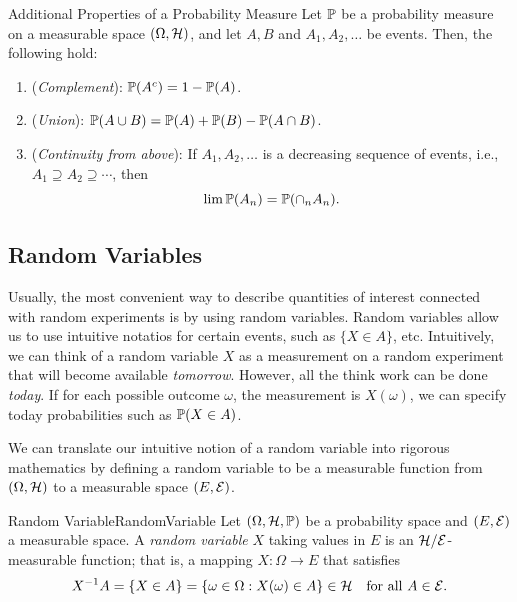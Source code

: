 \begin{thm}{Additional Properties of a Probability Measure}{}
	Let $\mathbb{P}$ be a probability measure on a measurable space $(\Omega, \mathcal{H})$, and let $A, B$ and $A_1, A_2, \dots$ be events. Then, the following hold:
	\begin{enumerate}
		\item (\textit{Complement}): $\mathbb{P}(A^c) = 1 - \mathbb{P}(A)$.
		\item (\textit{Union}): $\mathbb{P}(A \cup B) = \mathbb{P}(A) + \mathbb{P}(B) - \mathbb{P}(A \cap B)$.
		\item (\textit{Continuity from above}): If $A_1, A_2, \dots$ is a decreasing sequence of events, i.e., $A_1 \supseteq A_2 \supseteq \cdots$, then
		      \begin{equation}
			      \lim \mathbb{P}(A_n) = \mathbb{P}(\cap_n A_n).
			      \label{eq:ContinuityFromAbove}
		      \end{equation}
	\end{enumerate}
\end{thm}

\subsection{Random Variables}
Usually, the most convenient way to describe quantities of interest connected with random experiments is by using random variables. Random variables allow us to use intuitive notatios for certain events, such as \(\{X \in A\}\), etc. Intuitively, we can think of a random variable \(X\) as a measurement on a random experiment that will become available \textit{tomorrow}. However, all the think work can be done \textit{today}. If for each possible outcome \(\omega\), the measurement is \(X(\omega)\), we can specify today probabilities such as \(\mathbb{P}(X \in A)\).

We can translate our intuitive notion of a random variable into rigorous mathematics by defining a random variable to be a measurable function from \((\Omega, \mathcal{H})\) to a measurable space \((E, \mathcal{E})\).

\begin{defn}{Random Variable}{RandomVariable}
	Let $(\Omega, \mathcal{H}, \mathbb{P})$ be a probability space and $(E, \mathcal{E})$ a measurable space. A \textit{random variable} $X$ taking values in $E$ is an $\mathcal{H}/\mathcal{E}$-measurable function; that is, a mapping $X : \Omega \to E$ that satisfies
	\begin{equation}
		X^{-1}A = \{X \in A\} = \{\omega \in \Omega : X(\omega) \in A\} \in \mathcal{H} \quad \text{for all } A \in \mathcal{E}.
		\label{eq:RandomVariableDef}
	\end{equation}
\end{defn}

